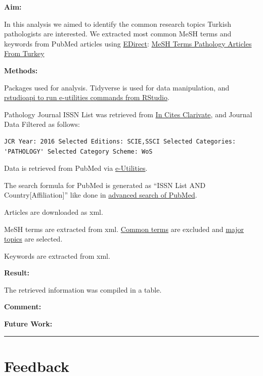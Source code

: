 \documentclass[
]{book}
\begin{document}
\textbf{Aim:}

In this analysis we aimed to identify the common research topics Turkish pathologists are interested. We extracted most common MeSH terms and keywords from PubMed articles using \href{https://dataguide.nlm.nih.gov/edirect/overview.html}{EDirect}:
\href{https://sbalci.github.io/pubmed/MeSH_Terms_Pathology_Articles_From_Turkey.html}{MeSH Terms Pathology Articles From Turkey}

\textbf{Methods:}

Packages used for analysis. Tidyverse is used for data manipulation, and \href{https://github.com/rstudio/rstudio/issues/2193}{rstudioapi to run e-utilities commands from RStudio}.

Pathology Journal ISSN List was retrieved from \href{https://jcr.incites.thomsonreuters.com/}{In Cites Clarivate}, and Journal Data Filtered as follows:

\begin{verbatim}
JCR Year: 2016 Selected Editions: SCIE,SSCI Selected Categories: 'PATHOLOGY' Selected Category Scheme: WoS
\end{verbatim}

Data is retrieved from PubMed via \href{https://dataguide.nlm.nih.gov/}{e-Utilities}.

The search formula for PubMed is generated as ``ISSN List AND Country{[}Affiliation{]}'' like done in \href{https://www.ncbi.nlm.nih.gov/pubmed/advanced}{advanced search of PubMed}.

Articles are downloaded as xml.

MeSH terms are extracted from xml. \href{https://www.nlm.nih.gov/bsd/indexing/training/CHK_010.html}{Common terms} are excluded and \href{https://www.nlm.nih.gov/bsd/disted/meshtutorial/principlesofmedlinesubjectindexing/majortopics/}{major topics} are selected.

Keywords are extracted from xml.

\textbf{Result:}

The retrieved information was compiled in a table.

\textbf{Comment:}

\textbf{Future Work:}

\begin{center}\rule{0.5\linewidth}{0.5pt}\end{center}

\hypertarget{feedback-1}{%
\chapter{Feedback}\label{feedback-1}}
\end{document}
